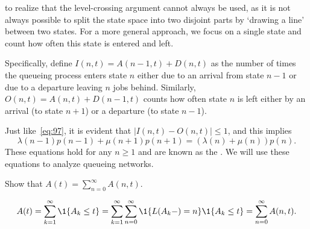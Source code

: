  to realize that the level-crossing argument cannot always be used, as it is not always possible to split the state space into two disjoint parts by `drawing a line' between two states.
For a more general approach, we focus on a single state and count how often this state is entered and left.
\begin{marginfigure}
\end{marginfigure}
Specifically, define $I(n,t) = A(n-1,t) + D(n,t)$ as the number of times the queueing process enters state $n$ either due to an arrival from state $n-1$ or due to a departure leaving $n$ jobs behind. Similarly,  $O(n,t) = A(n,t) + D(n-1,t)$ counts how often state $n$ is left either by an arrival (to state $n+1$) or a departure (to state $n-1$).


Just like~\eqref{eq:97}, it is evident that $|I(n,t)-O(n,t)|\leq 1$, and this implies
\begin{equation}\label{eq:104}
 \lambda(n-1)p(n-1)+\mu(n+1)p(n+1) = (\lambda(n)+\mu(n))p(n).
\end{equation}
These equations hold for any $n\geq 1$ and are known as the .
We will use these equations to analyze queueing networks.




\begin{exercise}\label{ex:36}
 Show that $A(t) =\sum_{n=0}^\infty A(n,t)$.
\begin{solution}
 \begin{equation*}
A(t) = \sum_{k=1}^\infty \1{A_k \leq t} = \sum_{k=1}^\infty \sum_{n=0}^\infty \1{\L(A_k-) = n} \1{A_k \leq t}  = \sum_{n=0}^\infty A(n,t).
 \end{equation*}
\end{solution}
\end{exercise}

